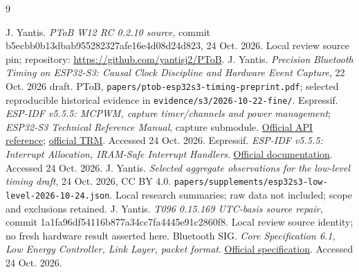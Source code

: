 \documentclass[10pt,letterpaper]{article}
\newcommand{\src}[1]{\nolinkurl{#1}}
\begin{document}
\vspace{-3pt}
\begin{thebibliography}{9}\footnotesize\raggedright\setlength{\itemsep}{0pt}\setlength{\parskip}{1pt}
 J. Yantis. \textit{PToB W12 RC 0.2.10 source}, commit b5ecbb0b13dbab955282327afe16e4d08d24d823, 24 Oct. 2026. Local review source pin; repository: \url{https://github.com/yantisj2/PToB}.
 J. Yantis. \textit{Precision Bluetooth Timing on ESP32-S3: Causal Clock Discipline and Hardware Event Capture}, 22 Oct. 2026 draft. PToB, \src{papers/ptob-esp32s3-timing-preprint.pdf}; selected reproducible historical evidence in \src{evidence/s3/2026-10-22-fine/}.
 Espressif. \textit{ESP-IDF v5.5.5: MCPWM, capture timer/channels and power management}; \textit{ESP32-S3 Technical Reference Manual}, capture submodule. \href{https://docs.espressif.com/projects/esp-idf/en/v5.5.5/esp32s3/api-reference/peripherals/mcpwm.html}{Official API reference}; \href{https://www.espressif.com/sites/default/files/documentation/esp32-s3_technical_reference_manual_en.pdf}{official TRM}. Accessed 24 Oct. 2026.
 Espressif. \textit{ESP-IDF v5.5.5: Interrupt Allocation, IRAM-Safe Interrupt Handlers}. \href{https://docs.espressif.com/projects/esp-idf/en/v5.5.5/esp32s3/api-reference/system/intr_alloc.html}{Official documentation}. Accessed 24 Oct. 2026.
 J. Yantis. \textit{Selected aggregate observations for the low-level timing draft}, 24 Oct. 2026, CC BY 4.0. \src{papers/supplements/esp32s3-low-level-2026-10-24.json}. Local research summaries; raw data not included; scope and exclusions retained.
 J. Yantis. \textit{T096 0.15.169 UTC-basis source repair}, commit 1a1fa96df54116b877a34cc7fa4445e91c2860f8. Local review source identity; no fresh hardware result asserted here.
 Bluetooth SIG. \textit{Core Specification 6.1, Low Energy Controller, Link Layer, packet format}. \href{https://www.bluetooth.com/wp-content/uploads/Files/Specification/HTML/Core-61/out/en/low-energy-controller/link-layer-specification.html}{Official specification}. Accessed 24 Oct. 2026.
\end{thebibliography}
\end{document}
